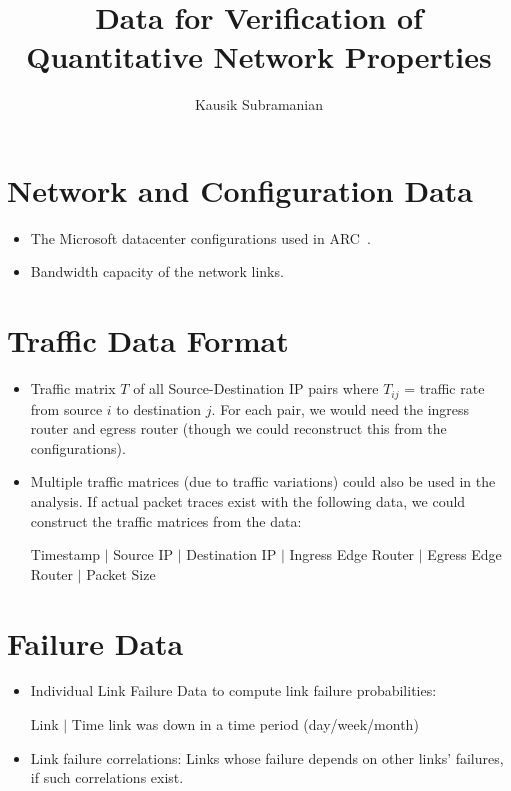 \documentclass[]{article}
\title{Data for Verification of Quantitative Network Properties}
\author{Kausik Subramanian}
\begin{document}
\maketitle

\section{Network and Configuration Data}
\begin{itemize}
\item The Microsoft datacenter configurations used in ARC~\cite{arc}.
\item Bandwidth capacity of the network links.
\end{itemize}

\section{Traffic Data Format}
\begin{itemize}
	\item Traffic matrix $T$ of all Source-Destination IP pairs where $T_{ij}$ = traffic rate
	from source $i$ to destination $j$. For each pair, we would need the ingress router and egress
	router (though we could reconstruct this from the configurations). 
	\item Multiple traffic matrices (due to traffic variations) could also be used in the analysis. 
	If actual packet traces exist with the following data, we could construct the traffic matrices
	from the data: 
	\begin{center}
	Timestamp $|$ Source IP $|$ Destination IP $|$ Ingress Edge Router $|$ Egress Edge Router $|$ Packet Size
	\end{center}
\end{itemize}

\section{Failure Data}
\begin{itemize}
	\item Individual Link Failure Data to compute link failure probabilities: 
	\begin{center}
	Link $|$ Time link was down in a time period (day/week/month)
	\end{center}
	\item Link failure correlations: Links whose failure depends on other links' failures, 
	if such correlations exist.
\end{itemize}

	


 
\begin{small}
	
\end{small}
\end{document}
